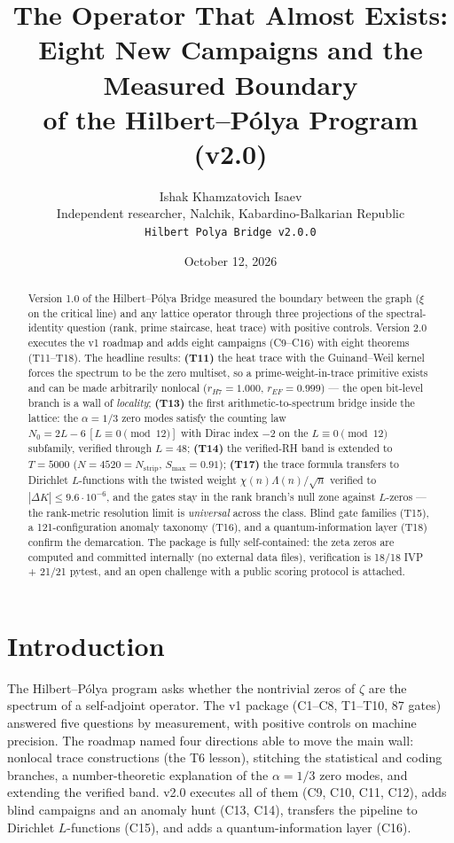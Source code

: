 \documentclass[11pt]{article}
\title{\bf The Operator That Almost Exists:\\ Eight New Campaigns and the Measured Boundary\\ of the Hilbert--P\'olya Program (v2.0)}
\author{Ishak Khamzatovich Isaev\\
\small Independent researcher, Nalchik, Kabardino-Balkarian Republic\\
\small \texttt{Hilbert Polya Bridge v2.0.0}}
\date{October 12, 2026}
\theoremstyle{definition}
\begin{document}
\maketitle

\begin{abstract}
Version 1.0 of the Hilbert--P\'olya Bridge measured the boundary between
the graph ($\xi$ on the critical line) and any lattice operator through
three projections of the spectral-identity question (rank, prime
staircase, heat trace) with
positive controls. Version 2.0 executes the v1 roadmap and adds eight
campaigns (C9--C16) with eight theorems (T11--T18). The headline results:
\textbf{(T11)} the heat trace with the Guinand--Weil kernel forces the
spectrum to be the zero multiset, so a prime-weight-in-trace primitive
exists and can be made arbitrarily nonlocal ($r_{H7}=1.000$,
$r_{EF}=0.999$) --- the open bit-level branch is a wall of \emph{locality};
\textbf{(T13)} the first arithmetic-to-spectrum bridge inside the lattice:
the $\alpha=1/3$ zero modes satisfy the counting law
$N_0 = 2L - 6\,[L \equiv 0 \pmod{12}]$ with Dirac index $-2$ on the
$L \equiv 0 \pmod{12}$ subfamily, verified through $L=48$;
\textbf{(T14)} the verified-RH band is extended to $T=5000$
($N = 4520 = N_{\mathrm{strip}}$, $S_{\max}=0.91$);
\textbf{(T17)} the trace formula transfers to Dirichlet $L$-functions with
the twisted weight $\chi(n)\Lambda(n)/\sqrt{n}$ verified to
$|\Delta K| \le 9.6\cdot 10^{-6}$, and the gates stay in the rank
branch's null zone against $L$-zeros --- the rank-metric resolution limit
is \emph{universal} across the class.
Blind gate families (T15), a 121-configuration anomaly taxonomy (T16), and
a quantum-information layer (T18) confirm the demarcation. The package is
fully self-contained: the zeta zeros are computed and committed internally
(no external data files), verification is 18/18 IVP + 21/21 pytest, and an
open challenge with a public scoring protocol is attached.
\end{abstract}

\section{Introduction}
The Hilbert--P\'olya program asks whether the nontrivial zeros of $\zeta$
are the spectrum of a self-adjoint operator. The v1 package (C1--C8,
T1--T10, 87 gates) answered five questions by measurement, with positive
controls on machine precision. The roadmap named four directions able to
move the main wall: nonlocal trace constructions (the T6 lesson), stitching
the statistical and coding branches, a number-theoretic explanation of the
$\alpha = 1/3$ zero modes, and extending the verified band. v2.0 executes
all of them (C9, C10, C11, C12), adds blind campaigns and an anomaly hunt
(C13, C14), transfers the pipeline to Dirichlet $L$-functions (C15), and
adds a quantum-information layer (C16).
\end{document}
